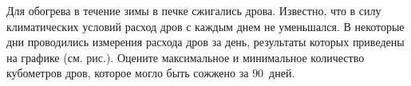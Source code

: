 	Для обогрева в течение зимы в печке сжигались дрова. Известно, что в силу климатических условий расход дров с каждым днем не уменьшался. В некоторые дни проводились измерения расхода дров за день, результаты которых приведены на графике (см. рис.). Оцените максимальное и минимальное количество кубометров дров, которое могло быть сожжено за $90$~дней.